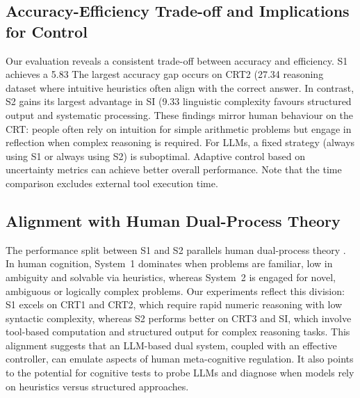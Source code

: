 \documentclass[11pt]{article}
\begin{document}
\subsection{Accuracy-Efficiency Trade-off and Implications for Control}
Our evaluation reveals a consistent trade-off between accuracy and efficiency.
S1 achieves a 5.83%
The largest accuracy gap occurs on CRT2 (27.34%
reasoning dataset where intuitive heuristics often align with the correct
answer.  In contrast, S2 gains its largest advantage in SI (9.33%
linguistic complexity favours structured output
and systematic processing.  These findings mirror human behaviour on the CRT: people often rely on
intuition for simple arithmetic problems but engage in reflection when
complex reasoning is required.  For LLMs, a fixed strategy (always using S1 or always using
S2) is suboptimal.  Adaptive control based on uncertainty metrics can achieve better overall performance.  Note that the time comparison
excludes external tool execution time.

\subsection{Alignment with Human Dual-Process Theory}
The performance split between S1 and S2 parallels human dual-process theory
\cite{kahneman2011thinking}.  In human cognition, System~1 dominates when
problems are familiar, low in ambiguity and solvable via heuristics, whereas
System~2 is engaged for novel, ambiguous or logically complex problems.  Our
experiments reflect this division: S1 excels on CRT1 and CRT2, which require
rapid numeric reasoning with low syntactic complexity, whereas S2 performs
better on CRT3 and SI, which involve tool-based computation and structured output
for complex reasoning tasks.
This alignment suggests that an LLM-based dual system,
coupled with an effective controller, can emulate aspects of human
meta-cognitive regulation.  It also points to the potential for cognitive
tests to probe LLMs and diagnose when models rely on heuristics versus
structured approaches.
\end{document}
